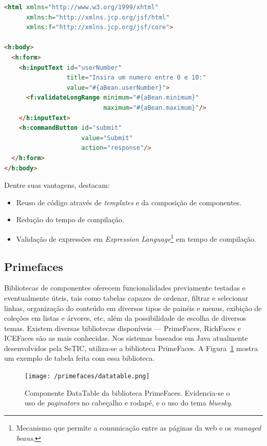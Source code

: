 \documentclass[
  10.5pt,				  %
	openright,			%
	twoside,			  %
  a5paper,
  chapter=TITLE,	%
	section=TITLE,	%
  hyphens,        %
	english,        %
	brazil          %
]{abntex2}
\begin{document}
\begin{lstlisting}[language=html, caption={Utilização de \emph{tags} em um arquivo XHTML.}, label={alg:tags}]
<html xmlns="http://www.w3.org/1999/xhtml"
      xmlns:h="http://xmlns.jcp.org/jsf/html"
      xmlns:f="http://xmlns.jcp.org/jsf/core">

<h:body>
  <h:form>
    <h:inputText id="userNumber"
                 title="Insira um numero entre 0 e 10:"
                 value="#{aBean.userNumber}">
      <f:validateLongRange minimum="#{aBean.minimum}"
                           maximum="#{aBean.maximum}"/>
    </h:inputText>
    <h:commandButton id="submit"
                     value="Submit"
                     action="response"/>
  </h:form>
</h:body>
\end{lstlisting}


Dentre suas vantagens, \cite{javaee7} destacam:
\begin{itemize}
  \item Reuso de código através de \emph{templates} e da composição de componentes.
  \item Redução do tempo de compilação.
  \item Validação de expressões em \emph{Expression Language}\footnote{Mecanismo que permite a comunicação entre as páginas da web e os \emph{managed beans}.} em tempo de compilação.
\end{itemize}


\subsection{Primefaces}\label{sec:primefaces}
Bibliotecas de componentes oferecem funcionalidades previamente  testadas e eventualmente úteis, tais como tabelas capazes de ordenar, filtrar e selecionar linhas, organização do conteúdo em diversos tipos de painéis e menus, exibição de coleções em listas e árvores, etc, além da possibilidade de escolha de diversos temas. Existem diversas bibliotecas disponíveis --- PrimeFaces, RichFaces e ICEFaces são as mais conhecidas. Nos sistemas baseados em Java atualmente desenvolvidos pela SeTIC, utiliza-se a biblioteca PrimeFaces. A Figura~\ref{fig:primefaces_datatable} mostra um exemplo de tabela feita com essa biblioteca.

\begin{figure}[!ht]
  \caption{\label{fig:primefaces_datatable}Componente DataTable da biblioteca PrimeFaces. Evidencia-se o uso de \emph{paginators} no cabeçalho e rodapé, e o uso do tema \emph{bluesky}.}
  \begin{center}
    \texttt{[image: /primefaces/datatable.png]}
  \end{center}
\end{figure}
\end{document}
